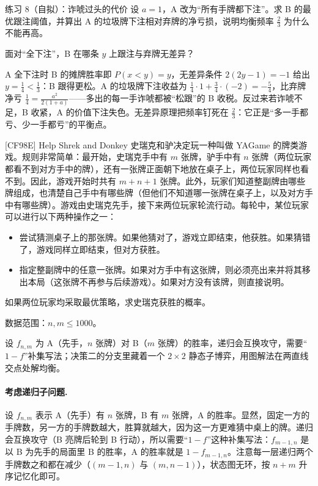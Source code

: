 \begin{problem}{练习 8（自拟）：诈唬过头的代价}
设 $a=1$，A 改为“所有手牌都下注”。求 B 的最优跟注阈值，并算出 A 的垃圾牌下注相对弃牌的净亏损，说明均衡频率 $\tfrac23$ 为什么不能再高。
\end{problem}

\hint 面对“全下注”，B 在哪条 $y$ 上跟注与弃牌无差异？

\sol A 全下注时 B 的摊牌胜率即 $P(x<y)=y$，无差异条件 $2(2y-1)=-1$ 给出 $y=\tfrac14<\tfrac13$：B 跟得更松。A 的垃圾牌下注收益为 $\tfrac14\cdot 1+\tfrac34\cdot(-2)=-\tfrac54$，比弃牌净亏 $\tfrac14=\tfrac{a^{2}}{2(1+a)}$——多出的每一手诈唬都被“松跟”的 B 收税。反过来若诈唬不足，B 收紧，A 的价值下注失色。无差异原理把频率钉死在 $\tfrac23$：它正是“多一手都亏、少一手都亏”的平衡点。
\begin{problem}{[CF98E] Help Shrek and Donkey}
史瑞克和驴决定玩一种叫做 YAGame 的牌类游戏。规则非常简单：最开始，史瑞克手中有 $m$ 张牌，驴手中有 $n$ 张牌（两位玩家都看不到对方手中的牌），还有一张牌正面朝下地放在桌子上，两位玩家同样也看不到。因此，游戏开始时共有 $m+n+1$ 张牌。此外，玩家们知道整副牌由哪些牌组成，也清楚自己手中有哪些牌（但他们不知道哪一张牌在桌子上，以及对方手中有哪些牌）。游戏由史瑞克先手，接下来两位玩家轮流行动。每轮中，某位玩家可以进行以下两种操作之一：
\begin{itemize}
\item 尝试猜测桌子上的那张牌。如果他猜对了，游戏立即结束，他获胜。如果猜错了，游戏同样立即结束，但对方获胜。
\item 指定整副牌中的任意一张牌。如果对方手中有这张牌，则必须亮出来并将其移出本局（这张牌不再参与后续游戏）。如果对方没有该牌，则直接说明。
\end{itemize}
如果两位玩家均采取最优策略，求史瑞克获胜的概率。

数据范围：$n,m\le1000$。
\end{problem}

\hint 设 $f_{n,m}$ 为 A（先手，$n$ 张牌）对 B（$m$ 张牌）的胜率，递归会互换攻守，需要“$1-f$”补集写法；决策二的分支里藏着一个 $2\times2$ 静态子博弈，用图解法在两直线交点处解均衡。

\sol \paragraph{考虑递归子问题.} 设 $f_{n,m}$ 表示 A（先手）有 $n$ 张牌，B 有 $m$ 张牌，A 的胜率。显然，固定一方的手牌数，另一方的手牌数越大，胜算就越大，因为这一方更难猜中桌上的牌。递归会互换攻守（B 亮牌后轮到 B 行动），所以需要“$1-f$”这种补集写法：$f_{m-1,n}$ 是以 B 为先手的局面里 B 的胜率，A 的胜率就是 $1-f_{m-1,n}$。注意每一层递归两个手牌数之和都在减少（$(m-1,n)$ 与 $(m,n-1)$），状态图无环，按 $n+m$ 升序记忆化即可。

